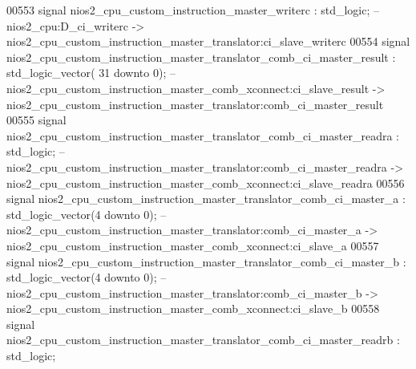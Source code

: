\begin{DoxyCode}
00553     \textcolor{keywordflow}{signal} \textcolor{vhdlchar}{nios2_cpu_custom_instruction_master_writerc}                                 \textcolor{vhdlchar}{:} \textcolor{comment}{std\_logic};\textcolor{keyword}{        
                   -- nios2\_cpu:D\_ci\_writerc -> nios2\_cpu\_custom\_instruction\_master\_translator:ci\_slave\_writerc}
00554     \textcolor{keywordflow}{signal} \textcolor{vhdlchar}{nios2_cpu_custom_instruction_master_translator_comb_ci_master_result}        \textcolor{vhdlchar}{:} \textcolor{comment}{std\_logic\_vector}\textcolor{vhdlchar}{(}\textcolor{vhdllogic}{}\textcolor{vhdllogic}{
      31} \textcolor{keywordflow}{downto} \textcolor{vhdllogic}{}\textcolor{vhdllogic}{0}\textcolor{vhdlchar}{)};\textcolor{keyword}{ -- nios2\_cpu\_custom\_instruction\_master\_comb\_xconnect:ci\_slave\_result ->
       nios2\_cpu\_custom\_instruction\_master\_translator:comb\_ci\_master\_result}
00555     \textcolor{keywordflow}{signal} \textcolor{vhdlchar}{nios2_cpu_custom_instruction_master_translator_comb_ci_master_readra}        \textcolor{vhdlchar}{:} \textcolor{comment}{std\_logic};\textcolor{keyword}{        
                   -- nios2\_cpu\_custom\_instruction\_master\_translator:comb\_ci\_master\_readra ->
       nios2\_cpu\_custom\_instruction\_master\_comb\_xconnect:ci\_slave\_readra}
00556     \textcolor{keywordflow}{signal} \textcolor{vhdlchar}{nios2_cpu_custom_instruction_master_translator_comb_ci_master_a}             \textcolor{vhdlchar}{:} \textcolor{comment}{std\_logic\_vector}\textcolor{vhdlchar}{(}\textcolor{vhdllogic}{}\textcolor{vhdllogic}{4}
       \textcolor{keywordflow}{downto} \textcolor{vhdllogic}{}\textcolor{vhdllogic}{0}\textcolor{vhdlchar}{)};\textcolor{keyword}{  -- nios2\_cpu\_custom\_instruction\_master\_translator:comb\_ci\_master\_a ->
       nios2\_cpu\_custom\_instruction\_master\_comb\_xconnect:ci\_slave\_a}
00557     \textcolor{keywordflow}{signal} \textcolor{vhdlchar}{nios2_cpu_custom_instruction_master_translator_comb_ci_master_b}             \textcolor{vhdlchar}{:} \textcolor{comment}{std\_logic\_vector}\textcolor{vhdlchar}{(}\textcolor{vhdllogic}{}\textcolor{vhdllogic}{4}
       \textcolor{keywordflow}{downto} \textcolor{vhdllogic}{}\textcolor{vhdllogic}{0}\textcolor{vhdlchar}{)};\textcolor{keyword}{  -- nios2\_cpu\_custom\_instruction\_master\_translator:comb\_ci\_master\_b ->
       nios2\_cpu\_custom\_instruction\_master\_comb\_xconnect:ci\_slave\_b}
00558     \textcolor{keywordflow}{signal} \textcolor{vhdlchar}{nios2_cpu_custom_instruction_master_translator_comb_ci_master_readrb}        \textcolor{vhdlchar}{:} \textcolor{comment}{std\_logic};\textcolor{keyword}{        
}
\end{DoxyCode}
